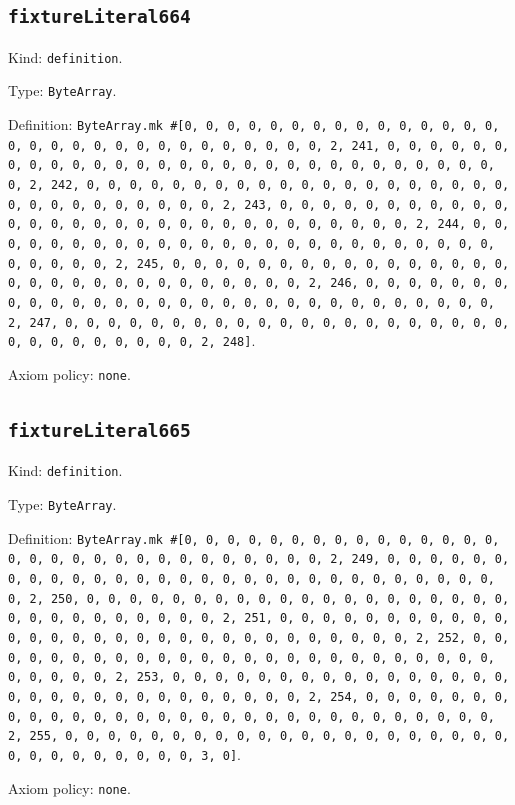 \documentclass[11pt]{article}
\begin{document}
\subsection*{\texttt{fixtureLiteral664}}
\noindent Kind: \texttt{definition}.\par
\noindent Type: \texttt{ByteArray}.\par
\noindent Definition: \texttt{ByteArray.mk \#[0, 0, 0, 0, 0, 0, 0, 0, 0, 0, 0, 0, 0, 0, 0, 0, 0, 0, 0, 0, 0, 0, 0, 0, 0, 0, 0, 0, 0, 0, 2, 241, 0, 0, 0, 0, 0, 0, 0, 0, 0, 0, 0, 0, 0, 0, 0, 0, 0, 0, 0, 0, 0, 0, 0, 0, 0, 0, 0, 0, 0, 0, 2, 242, 0, 0, 0, 0, 0, 0, 0, 0, 0, 0, 0, 0, 0, 0, 0, 0, 0, 0, 0, 0, 0, 0, 0, 0, 0, 0, 0, 0, 0, 0, 2, 243, 0, 0, 0, 0, 0, 0, 0, 0, 0, 0, 0, 0, 0, 0, 0, 0, 0, 0, 0, 0, 0, 0, 0, 0, 0, 0, 0, 0, 0, 0, 2, 244, 0, 0, 0, 0, 0, 0, 0, 0, 0, 0, 0, 0, 0, 0, 0, 0, 0, 0, 0, 0, 0, 0, 0, 0, 0, 0, 0, 0, 0, 0, 2, 245, 0, 0, 0, 0, 0, 0, 0, 0, 0, 0, 0, 0, 0, 0, 0, 0, 0, 0, 0, 0, 0, 0, 0, 0, 0, 0, 0, 0, 0, 0, 2, 246, 0, 0, 0, 0, 0, 0, 0, 0, 0, 0, 0, 0, 0, 0, 0, 0, 0, 0, 0, 0, 0, 0, 0, 0, 0, 0, 0, 0, 0, 0, 2, 247, 0, 0, 0, 0, 0, 0, 0, 0, 0, 0, 0, 0, 0, 0, 0, 0, 0, 0, 0, 0, 0, 0, 0, 0, 0, 0, 0, 0, 0, 0, 2, 248]}.\par
\noindent Axiom policy: \texttt{none}.\par
\subsection*{\texttt{fixtureLiteral665}}
\noindent Kind: \texttt{definition}.\par
\noindent Type: \texttt{ByteArray}.\par
\noindent Definition: \texttt{ByteArray.mk \#[0, 0, 0, 0, 0, 0, 0, 0, 0, 0, 0, 0, 0, 0, 0, 0, 0, 0, 0, 0, 0, 0, 0, 0, 0, 0, 0, 0, 0, 0, 2, 249, 0, 0, 0, 0, 0, 0, 0, 0, 0, 0, 0, 0, 0, 0, 0, 0, 0, 0, 0, 0, 0, 0, 0, 0, 0, 0, 0, 0, 0, 0, 2, 250, 0, 0, 0, 0, 0, 0, 0, 0, 0, 0, 0, 0, 0, 0, 0, 0, 0, 0, 0, 0, 0, 0, 0, 0, 0, 0, 0, 0, 0, 0, 2, 251, 0, 0, 0, 0, 0, 0, 0, 0, 0, 0, 0, 0, 0, 0, 0, 0, 0, 0, 0, 0, 0, 0, 0, 0, 0, 0, 0, 0, 0, 0, 2, 252, 0, 0, 0, 0, 0, 0, 0, 0, 0, 0, 0, 0, 0, 0, 0, 0, 0, 0, 0, 0, 0, 0, 0, 0, 0, 0, 0, 0, 0, 0, 2, 253, 0, 0, 0, 0, 0, 0, 0, 0, 0, 0, 0, 0, 0, 0, 0, 0, 0, 0, 0, 0, 0, 0, 0, 0, 0, 0, 0, 0, 0, 0, 2, 254, 0, 0, 0, 0, 0, 0, 0, 0, 0, 0, 0, 0, 0, 0, 0, 0, 0, 0, 0, 0, 0, 0, 0, 0, 0, 0, 0, 0, 0, 0, 2, 255, 0, 0, 0, 0, 0, 0, 0, 0, 0, 0, 0, 0, 0, 0, 0, 0, 0, 0, 0, 0, 0, 0, 0, 0, 0, 0, 0, 0, 0, 0, 3, 0]}.\par
\noindent Axiom policy: \texttt{none}.\par
\end{document}
